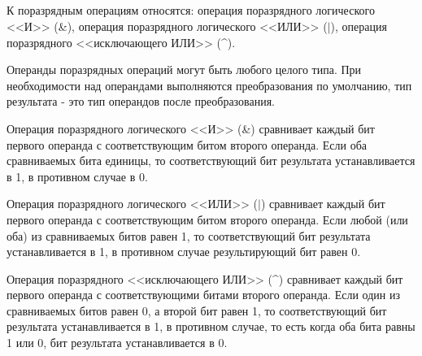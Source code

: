 \subsection{}

К поразрядным операциям относятся: операция поразрядного логического <<И>> (\&), операция поразрядного логического <<ИЛИ>> ($\vert$), операция поразрядного <<исключающего ИЛИ>>  (\textasciicircum). \killoverfullbefore

Операнды поразрядных операций могут быть любого целого типа. При необходимости над операндами выполняются преобразования по умолчанию, тип результата - это тип операндов после преобразования. \killoverfullbefore

Операция поразрядного логического <<И>> (\&) сравнивает каждый бит первого операнда с соответствующим битом второго операнда. Если оба сравниваемых бита единицы, то соответствующий бит результата устанавливается в 1, в противном случае в 0. \killoverfullbefore

Операция поразрядного логического <<ИЛИ>> ($\vert$) сравнивает каждый бит первого операнда с соответствующим битом второго операнда. Если любой (или оба) из сравниваемых битов равен 1, то соответствующий бит результата устанавливается в 1, в противном случае результирующий бит равен 0. \killoverfullbefore

Операция поразрядного <<исключающего ИЛИ>> (\textasciicircum) сравнивает каждый бит первого операнда с соответствующими битами второго операнда. Если один из сравниваемых битов равен 0, а второй бит равен 1, то соответствующий бит результата устанавливается в 1, в противном случае, то есть когда оба бита равны 1 или 0, бит результата устанавливается в 0. \killoverfullbefore \BL 

